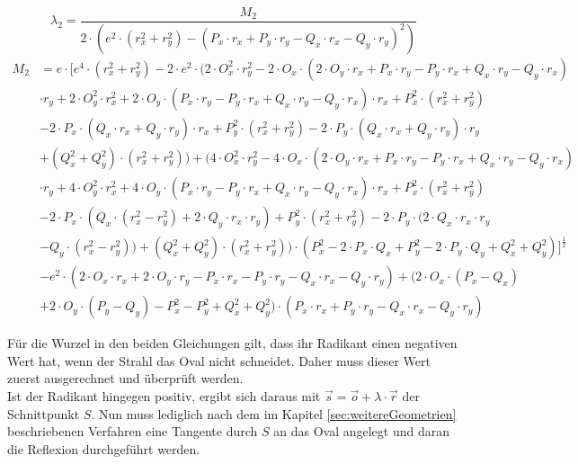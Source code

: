 \documentclass[reducespace,stylepage,semiarbeit]{spezidoc}
\begin{document}
\begin{equation*}
\lambda_2 = \dfrac{M_2}{2 \cdot (e^{2} \cdot (r_x^{2}+r_y^{2})-(P_x \cdot r_x+P_y \cdot r_y-Q_x \cdot r_x-Q_y \cdot r_y)^{2})}
\end{equation*}
\begin{equation*}
\begin{aligned}
M_2 &= e \cdot [e^{4} \cdot (r_x^{2} + r_y^{2}) - 2 \cdot e^{2} \cdot (2 \cdot O_x^{2} \cdot r_y^{2} - 2 \cdot O_x \cdot (2 \cdot O_y \cdot r_x + P_x \cdot r_y - P_y \cdot r_x + Q_x \cdot r_y - Q_y \cdot r_x) \\
& \cdot r_y + 2 \cdot O_y^{2} \cdot r_x^{2} + 2 \cdot O_y \cdot (P_x \cdot r_y - P_y \cdot r_x + Q_x \cdot r_y - Q_y \cdot r_x) \cdot r_x + P_x^{2} \cdot (r_x^{2} + r_y^{2}) \\
& - 2 \cdot P_x \cdot (Q_x \cdot r_x + Q_y \cdot r_y) \cdot r_x + P_y^{2} \cdot (r_x^{2} + r_y^{2}) - 2 \cdot P_y \cdot (Q_x \cdot r_x + Q_y \cdot r_y) \cdot r_y \\
&+ (Q_x^{2} + Q_y^{2}) \cdot (r_x^{2} + r_y^{2})) + (4 \cdot O_x^{2} \cdot r_y^{2} - 4 \cdot O_x \cdot (2 \cdot O_y \cdot r_x + P_x \cdot r_y - P_y \cdot r_x + Q_x \cdot r_y - Q_y \cdot r_x) \\
&\cdot r_y + 4 \cdot O_y^{2} \cdot r_x^{2} + 4 \cdot O_y \cdot (P_x \cdot r_y - P_y \cdot r_x + Q_x \cdot r_y - Q_y \cdot r_x) \cdot r_x + P_x^{2} \cdot (r_x^{2} + r_y^{2}) \\
&- 2 \cdot P_x \cdot (Q_x \cdot (r_x^{2} - r_y^{2}) + 2 \cdot Q_y \cdot r_x \cdot r_y) + P_y^{2} \cdot (r_x^{2} + r_y^{2}) - 2 \cdot P_y \cdot (2 \cdot Q_x \cdot r_x \cdot r_y \\
&- Q_y \cdot (r_x^{2} - r_y^{2})) + (Q_x^{2} + Q_y^{2}) \cdot (r_x^{2} + r_y^{2})) \cdot (P_x^{2} - 2 \cdot P_x \cdot Q_x + P_y^{2} - 2 \cdot P_y \cdot Q_y + Q_x^{2} + Q_y^{2})]^{\frac{1}{2}} \\
&- e^{2} \cdot (2 \cdot O_x \cdot r_x + 2 \cdot O_y \cdot r_y - P_x \cdot r_x - P_y \cdot r_y - Q_x \cdot r_x - Q_y \cdot r_y) + (2 \cdot O_x \cdot (P_x - Q_x) \\
&+ 2 \cdot O_y \cdot (P_y - Q_y) - P_x^{2} - P_y^{2} + Q_x^{2} + Q_y^{2}) \cdot (P_x \cdot r_x + P_y \cdot r_y - Q_x \cdot r_x - Q_y \cdot r_y)
\end{aligned}
\end{equation*}

Für die Wurzel in den beiden Gleichungen gilt, dass ihr Radikant einen negativen Wert hat, wenn der Strahl das Oval nicht schneidet. Daher muss dieser Wert zuerst ausgerechnet und überprüft werden.\\
Ist der Radikant hingegen positiv, ergibt sich daraus mit $\vec{s} = \vec{o} + \lambda \cdot \vec{r}$ der Schnittpunkt $S$. Nun muss lediglich nach dem im Kapitel \ref{sec:weitereGeometrien} beschriebenen Verfahren eine Tangente durch $S$ an das Oval angelegt und daran die Reflexion durchgeführt werden.
\end{document}
